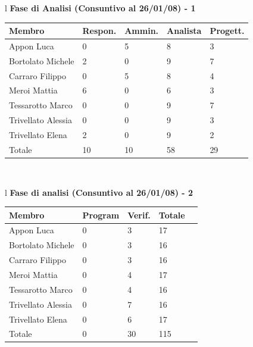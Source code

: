\documentclass[11pt,titlepage,a4paper]{report}
\begin{document}
\begin{table}[hbtp]
\large{
\begin{tabular}{l}
\Large{\textbf{\textsf{Fase di Analisi (Consuntivo al 26/01/08) - 1}}} \\
\begin{tabular}{||p{3.5cm}||p{2cm}||p{2cm}||p{2cm}||p{2cm}||}
\hline
\textbf{Membro} & \textbf{Respon.} & \textbf{Ammin.} & \textbf{Analista}
& \textbf{Progett.}\\
\hline
{Appon Luca}&0&5&8&3 \\ 
\hline 
{Bortolato Michele} &2&0&9&7\\ 
\hline
{Carraro Filippo}&0&5&8&4 \\
\hline
{Meroi Mattia}&6&0&6&3\\
\hline
{Tessarotto Marco} &0&0&9&7\\
\hline
{Trivellato Alessia} &0&0&9&3 \\
\hline
{Trivellato Elena} &2&0&9&2 \\
\hline
{Totale}& 10&10&58&29 \\
\hline
\end{tabular} \\
\end{tabular}
}
\end{table}

\begin{table}[hbtp]
\large{
\begin{tabular}{l}
\Large{\textbf{\textsf{Fase di analisi (Consuntivo al 26/01/08) - 2}}} \\
\begin{tabular}{||p{3.5cm}||p{2cm}||p{2cm}||p{2cm}||p{2cm}||}
\hline
\textbf{Membro} & \textbf{Program} & \textbf{Verif.} & \textbf{Totale}\\
\hline
{Appon Luca}&0&3&17 \\ 
\hline 
{Bortolato Michele} &0&3&16\\ 
\hline
{Carraro Filippo}&0&3&16 \\
\hline
{Meroi Mattia}&0&4&17\\
\hline
{Tessarotto Marco} &0&4&16\\
\hline
{Trivellato Alessia} &0&7&16 \\
\hline
{Trivellato Elena} &0&6&17 \\
\hline
{Totale} &0&30&115 \\
\hline
\end{tabular} \\
\end{tabular}
}
\end{table}
\end{document}
